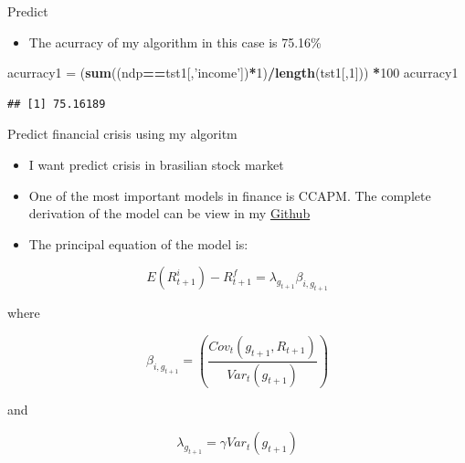 \documentclass[
  10pt,
  ignorenonframetext,
]{beamer}
\newenvironment{Shaded}{\begin{snugshade}}{\end{snugshade}}
\newcommand{\DecValTok}[1]{\textcolor[rgb]{0.00,0.00,0.81}{#1}}
\newcommand{\KeywordTok}[1]{\textcolor[rgb]{0.13,0.29,0.53}{\textbf{#1}}}
\newcommand{\NormalTok}[1]{#1}
\newcommand{\OperatorTok}[1]{\textcolor[rgb]{0.81,0.36,0.00}{\textbf{#1}}}
\newcommand{\StringTok}[1]{\textcolor[rgb]{0.31,0.60,0.02}{#1}}
\providecommand{\tightlist}{%
  \setlength{\itemsep}{0pt}\setlength{\parskip}{0pt}}
\begin{document}
\begin{frame}[fragile]{Predict}
\protect\hypertarget{predict-8}{}

\begin{itemize}
\tightlist
\item
  The acurracy of my algorithm in this case is 75.16\%
\end{itemize}

\begin{Shaded}
\begin{Highlighting}[]
\NormalTok{acurracy1 =}\StringTok{ }\NormalTok{(}\KeywordTok{sum}\NormalTok{((ndp}\OperatorTok{==}\NormalTok{tst1[,}\StringTok{'income'}\NormalTok{])}\OperatorTok{*}\DecValTok{1}\NormalTok{)}\OperatorTok{/}\KeywordTok{length}\NormalTok{(tst1[,}\DecValTok{1}\NormalTok{])) }\OperatorTok{*}\DecValTok{100}
\NormalTok{acurracy1 }
\end{Highlighting}
\end{Shaded}

\begin{verbatim}
## [1] 75.16189
\end{verbatim}

\end{frame}

\begin{frame}{Predict financial crisis using my algoritm}
\protect\hypertarget{predict-financial-crisis-using-my-algoritm}{}

\begin{itemize}
\tightlist
\item
  I want predict crisis in brasilian stock market
\item
  One of the most important models in finance is CCAPM. The complete
  derivation of the model can be view in my
  \href{https://mj-ribeiro.github.io/ecofin.pdf}{Github}
\item
  The principal equation of the model is:
\end{itemize}

\begin{equation}\label{eq12}
    E(R^i_{t+1}) - R^f_{t+1} = \lambda_{g_{t+1}} \beta_{i,g_{t+1}}
\end{equation}

where

\begin{equation}\label{eq13}
    \beta_{i,g_{t+1}} = \left(\frac{Cov_t(g_{t+1}, R_{t+1})}{Var_t(g_{t+1})} \right) 
\end{equation}

and

\begin{equation}\label{eq14}
    \lambda_{g_{t+1}} = \gamma Var_t(g_{t+1})
\end{equation}

\end{frame}
\end{document}
